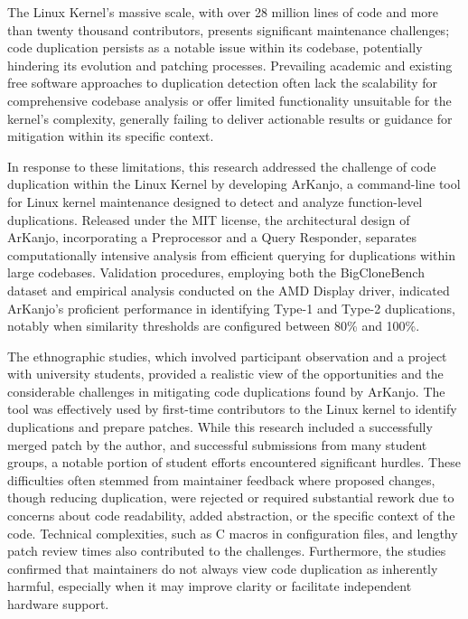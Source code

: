 The Linux Kernel's massive scale, with over 28 million lines of code 
and more than twenty thousand contributors, presents significant maintenance 
challenges; code duplication persists as a notable issue within its codebase, 
potentially hindering its evolution and patching processes. Prevailing academic 
and existing free software approaches to duplication detection often lack the 
scalability for comprehensive codebase analysis or offer limited functionality 
unsuitable for the kernel's complexity, generally failing to deliver actionable 
results or guidance for mitigation within its specific context.

In response to these limitations, this research addressed the challenge of code 
duplication within the Linux Kernel by developing ArKanjo, a command-line tool 
for Linux kernel maintenance designed to detect and analyze function-level duplications. 
Released under the MIT license, the architectural design of ArKanjo, incorporating a 
Preprocessor and a Query Responder, separates computationally intensive analysis from 
efficient querying for duplications within large codebases. Validation procedures, 
employing both the BigCloneBench dataset and empirical analysis conducted on the AMD 
Display driver, indicated ArKanjo's proficient performance in identifying Type-1 and 
Type-2 duplications, notably when similarity thresholds are configured between 80\% and 100\%.

The ethnographic studies, which involved participant observation and a project with university 
students, provided a realistic view of the opportunities and the considerable challenges in 
mitigating code duplications found by ArKanjo. The tool was effectively used by first-time 
contributors to the Linux kernel to 
identify duplications and prepare patches. While this research included a successfully merged 
patch by the author, and successful submissions from many student groups, a notable portion of 
student efforts encountered significant hurdles. These difficulties often stemmed from maintainer 
feedback where proposed changes, though reducing duplication, were rejected or required 
substantial rework due to concerns about code readability, added abstraction, or the specific 
context of the code. Technical complexities, such as C macros in configuration files, and lengthy 
patch review times also contributed to the challenges. Furthermore, the studies confirmed that 
maintainers do not always view code duplication as inherently harmful, especially when it may 
improve clarity or facilitate independent hardware support.

